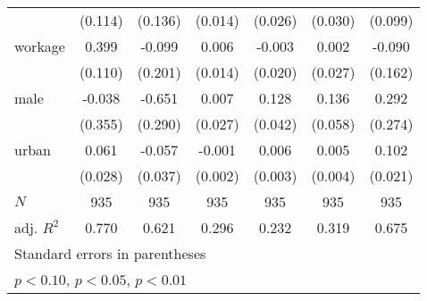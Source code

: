 {\begin{tabular}{l*{6}{c}}
            &     (0.114)         &     (0.136)         &     (0.014)         &     (0.026)         &     (0.030)         &     (0.099)         \\
[1em]
workage     &       0.399\sym{***}&      -0.099         &       0.006         &      -0.003         &       0.002         &      -0.090         \\
            &     (0.110)         &     (0.201)         &     (0.014)         &     (0.020)         &     (0.027)         &     (0.162)         \\
[1em]
male        &      -0.038         &      -0.651\sym{**} &       0.007         &       0.128\sym{***}&       0.136\sym{**} &       0.292         \\
            &     (0.355)         &     (0.290)         &     (0.027)         &     (0.042)         &     (0.058)         &     (0.274)         \\
[1em]
urban       &       0.061\sym{**} &      -0.057         &      -0.001         &       0.006\sym{**} &       0.005         &       0.102\sym{***}\\
            &     (0.028)         &     (0.037)         &     (0.002)         &     (0.003)         &     (0.004)         &     (0.021)         \\
\hline
\(N\)       &         935         &         935         &         935         &         935         &         935         &         935         \\
adj. \(R^{2}\)&       0.770         &       0.621         &       0.296         &       0.232         &       0.319         &       0.675         \\
\hline\hline
\multicolumn{7}{l}{\footnotesize Standard errors in parentheses}\\
\multicolumn{7}{l}{\footnotesize \sym{*} \(p<0.10\), \sym{**} \(p<0.05\), \sym{***} \(p<0.01\)}\\
\end{tabular}
}
